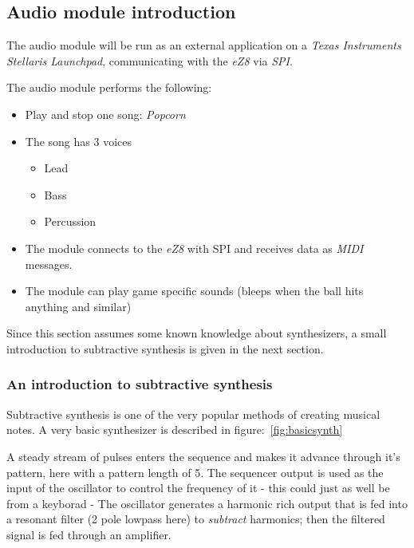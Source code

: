 \subsection{Audio module introduction}
The audio module will be run as an external application on a \emph{Texas
Instruments} \emph{Stellaris Launchpad}, communicating with the \emph{eZ8} via
\emph{SPI}.

The audio module performs the following:
\begin{itemize}
  \item Play and stop one song: \emph{Popcorn}
  \item The song has 3 voices
  \begin{itemize}
    \item Lead
    \item Bass
    \item Percussion
  \end{itemize}
  \item The module connects to the \emph{eZ8} with SPI and receives data as
  \emph{MIDI} messages.
  \item The module can play game specific sounds (bleeps when the ball hits
  anything and similar)
\end{itemize}

Since this section assumes some known knowledge about synthesizers, a small
introduction to subtractive synthesis is given in the next section.

\subsubsection{An introduction to subtractive synthesis}\label{synthxp}
Subtractive synthesis is one of the very popular methods of creating musical
notes. A very basic synthesizer is described in figure:~\ref{fig:basicsynth}


A steady stream of pulses enters the sequence and makes it advance through it's
pattern, here with a pattern length of 5. The sequencer output is used as the
input of the oscillator to control the frequency of it - this could just as well
be from a keyborad - The oscillator generates a harmonic rich output that is fed
into a resonant filter (2 pole lowpass here) to \emph{subtract} harmonics; then
the filtered signal is fed through an amplifier.

